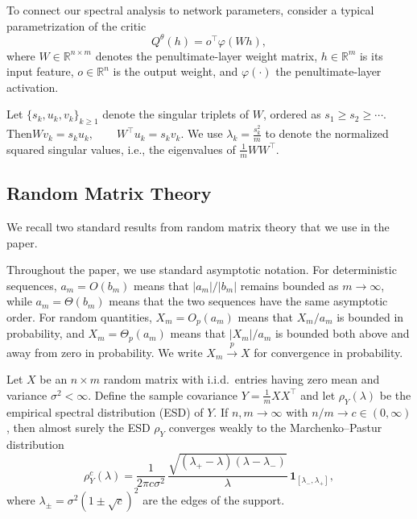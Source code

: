 To connect our spectral analysis to network parameters, consider a typical parametrization of the critic  \begin{equation}
Q^\theta(h)
=
o^\top \varphi(Wh),
\label{eq:critic_local}
\end{equation} where $W\in\mathbb{R}^{n\times m}$ denotes the penultimate-layer weight matrix, $h\in\mathbb{R}^m$ is its input feature,
$o\in\mathbb{R}^n$ is the output weight, and $\varphi(\cdot)$ the penultimate-layer activation.

Let $\{s_k,u_k,v_k\}_{k\geq 1}$ denote the singular triplets of $W$,
ordered as $s_1\geq s_2\geq\cdots$. Then$
Wv_k=s_ku_k,
\qquad
W^\top u_k=s_kv_k.$
We use $\lambda_k
=
\frac{s_k^2}{m}$ to denote the normalized squared singular values, i.e., the eigenvalues
of $\frac{1}{m}WW^\top$.


\subsection{Random Matrix Theory}
We recall two standard results from random matrix theory that we use in the paper.

Throughout the paper, we use standard asymptotic notation. For deterministic
sequences, $a_m=O(b_m)$ means that $|a_m|/|b_m|$ remains bounded as
$m\rightarrow\infty$, while $a_m=\Theta(b_m)$ means that the two sequences
have the same asymptotic order. For random quantities, $X_m=O_p(a_m)$ means
that $X_m/a_m$ is bounded in probability, and
$X_m=\Theta_p(a_m)$ means that $|X_m|/a_m$ is bounded both above and away
from zero in probability. We write $X_m\xrightarrow{p}X$ for convergence
in probability.

\begin{theorem}
\label{thm:rmt1}
Let $X$ be an $n\times m$ random matrix with i.i.d.\ entries having zero mean and variance $\sigma^2<\infty$. Define the sample covariance $Y=\tfrac{1}{m}XX^\top$ and let $\rho_Y(\lambda)$ be the empirical spectral distribution (ESD) of $Y$. If $n,m\to\infty$ with $n/m\to c\in(0,\infty)$, then almost surely the ESD $\rho_Y$ converges weakly to the Marchenko--Pastur distribution
\[
\rho^c_Y(\lambda)=\frac{1}{2\pi c\sigma^2}\,\frac{\sqrt{(\lambda_+-\lambda)(\lambda-\lambda_-)}}{\lambda}\,\mathbf{1}_{[\lambda_-,\lambda_+]},
\]
where $\lambda_{\pm}=\sigma^2(1\pm\sqrt{c})^2$ are the edges of the support.

\end{theorem}

